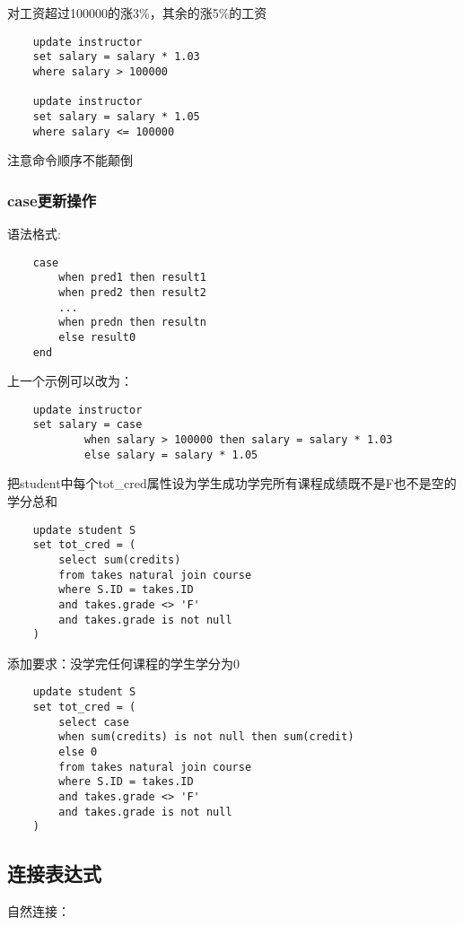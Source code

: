 \documentclass{article}        %
\begin{document}
对工资超过100000的涨3\%，其余的涨5\%的工资
\begin{verbatim}
    update instructor 
    set salary = salary * 1.03 
    where salary > 100000

    update instructor 
    set salary = salary * 1.05
    where salary <= 100000
\end{verbatim}

注意命令顺序不能颠倒

\subsubsection{case更新操作}

语法格式:

\begin{verbatim}
    case 
        when pred1 then result1 
        when pred2 then result2 
        ... 
        when predn then resultn
        else result0
    end
\end{verbatim}

上一个示例可以改为：
\begin{verbatim}
    update instructor 
    set salary = case 
            when salary > 100000 then salary = salary * 1.03 
            else salary = salary * 1.05
\end{verbatim}

把student中每个tot\_cred属性设为学生成功学完所有课程成绩既不是F也不是空的学分总和

\begin{verbatim}
    update student S 
    set tot_cred = (
        select sum(credits)
        from takes natural join course 
        where S.ID = takes.ID 
        and takes.grade <> 'F' 
        and takes.grade is not null
    )   
\end{verbatim}

添加要求：没学完任何课程的学生学分为0
\begin{verbatim}
    update student S 
    set tot_cred = (
        select case
        when sum(credits) is not null then sum(credit) 
        else 0
        from takes natural join course 
        where S.ID = takes.ID 
        and takes.grade <> 'F' 
        and takes.grade is not null
    )
\end{verbatim}

\subsection{连接表达式}

自然连接：
\end{document}
